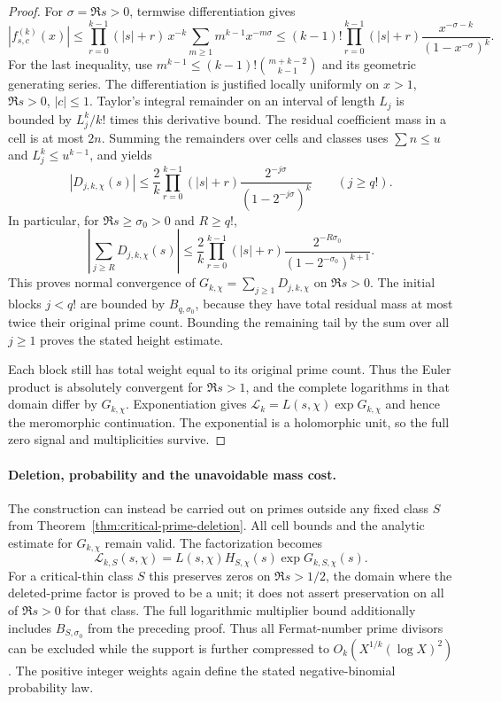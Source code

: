 \documentclass[11pt]{article}
\theoremstyle{definition}
\begin{document}
\begin{proof}
For $\sigma=\Re s>0$, termwise differentiation gives
\[
 |f^{(k)}_{s,c}(x)|
 \le \prod_{r=0}^{k-1}(|s|+r)\,x^{-k}
          \sum_{m\ge1}m^{k-1}x^{-m\sigma}
 \le
 (k-1)!\prod_{r=0}^{k-1}(|s|+r)
       \frac{x^{-\sigma-k}}{(1-x^{-\sigma})^k}.
\]
For the last inequality, use
$m^{k-1}\le(k-1)!\binom{m+k-2}{k-1}$ and its geometric
generating series. The differentiation is justified
locally uniformly on $x>1$, $\Re s>0$, $|c|\le1$.
Taylor's integral remainder on an interval of length $L_j$
is bounded by $L_j^k/k!$ times this derivative bound.
The residual coefficient mass in a cell is at most $2n$.
Summing the remainders over cells and classes uses
$\sum n\le u$ and $L_j^k\le u^{k-1}$, and yields
\[
 |D_{j,k,\chi}(s)|
 \le\frac2k\prod_{r=0}^{k-1}(|s|+r)
       \frac{2^{-j\sigma}}{(1-2^{-j\sigma})^k}
 \qquad(j\ge q!).
\]
In particular, for $\Re s\ge\sigma_0>0$ and $R\ge q!$,
\[
 \left|\sum_{j\ge R}D_{j,k,\chi}(s)\right|
 \le\frac2k\prod_{r=0}^{k-1}(|s|+r)
       \frac{2^{-R\sigma_0}}{(1-2^{-\sigma_0})^{k+1}}.
\]
This proves normal convergence of
$G_{k,\chi}=\sum_{j\ge1}D_{j,k,\chi}$ on $\Re s>0$.
The initial blocks $j<q!$ are bounded by $B_{q,\sigma_0}$,
because they have total residual mass at most twice their
original prime count. Bounding the remaining tail by the
sum over all $j\ge1$ proves the stated height estimate.

Each block still has total weight equal to its original
prime count. Thus the Euler product is absolutely
convergent for $\Re s>1$, and the complete logarithms in
that domain differ by $G_{k,\chi}$.
Exponentiation gives
$\mathcal L_k=L(s,\chi)\exp G_{k,\chi}$ and hence the
meromorphic continuation. The exponential is a holomorphic
unit, so the full zero signal and multiplicities survive.
\end{proof}

\paragraph{Deletion, probability and the unavoidable mass cost.}
The construction can instead be carried out on primes outside
any fixed class $S$ from
Theorem~\ref{thm:critical-prime-deletion}. All cell bounds
and the analytic estimate for $G_{k,\chi}$ remain valid.
The factorization becomes
\[
 \mathcal L_{k,S}(s,\chi)
   =L(s,\chi)H_{S,\chi}(s)\exp G_{k,S,\chi}(s).
\]
For a critical-thin class $S$ this preserves zeros on
$\Re s>1/2$, the domain where the deleted-prime factor is
proved to be a unit; it does not assert preservation on all
of $\Re s>0$ for that class.
The full logarithmic multiplier bound additionally includes
$B_{S,\sigma_0}$ from the preceding proof.
Thus all Fermat-number prime divisors can be excluded
while the support is further compressed to
$O_k(X^{1/k}(\log X)^2)$.
The positive integer weights again define the stated
negative-binomial probability law.
\end{document}
